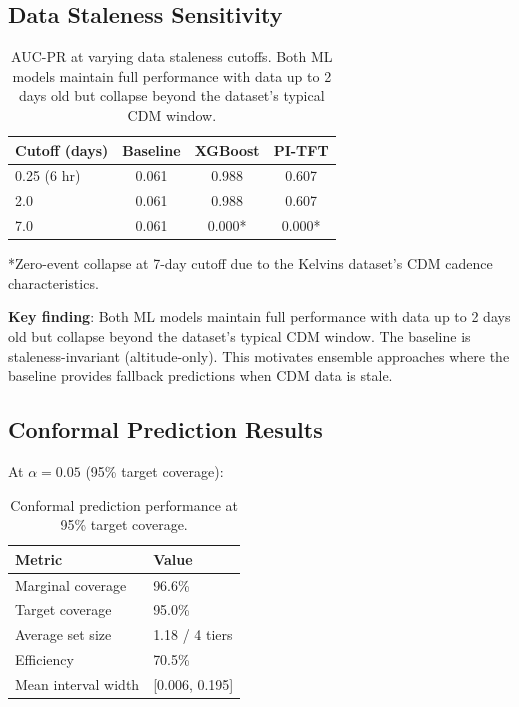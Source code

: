 \documentclass{article}
\begin{document}
\subsection{Data Staleness Sensitivity}
\label{sec:staleness}

\begin{table}[h]
\centering
\caption{AUC-PR at varying data staleness cutoffs. Both ML models maintain full performance with data up to 2 days old but collapse beyond the dataset's typical CDM window.}
\label{tab:staleness}
\begin{tabular}{@{}lccc@{}}
\toprule
Cutoff (days) & Baseline & XGBoost & PI-TFT \\
\midrule
0.25 (6 hr) & 0.061 & 0.988 & 0.607 \\
2.0 & 0.061 & 0.988 & 0.607 \\
7.0 & 0.061 & 0.000* & 0.000* \\
\bottomrule
\end{tabular}

\vspace{2pt}
\footnotesize{*Zero-event collapse at 7-day cutoff due to the Kelvins dataset's CDM cadence characteristics.}
\end{table}

\textbf{Key finding}: Both ML models maintain full performance with data up to 2 days old but collapse beyond the dataset's typical CDM window. The baseline is staleness-invariant (altitude-only). This motivates ensemble approaches where the baseline provides fallback predictions when CDM data is stale.

\subsection{Conformal Prediction Results}
\label{sec:conformal-results}

At $\alpha = 0.05$ (95\% target coverage):

\begin{table}[h]
\centering
\caption{Conformal prediction performance at 95\% target coverage.}
\label{tab:conformal}
\begin{tabular}{@{}ll@{}}
\toprule
Metric & Value \\
\midrule
Marginal coverage & 96.6\% \\
Target coverage & 95.0\% \\
Average set size & 1.18 / 4 tiers \\
Efficiency & 70.5\% \\
Mean interval width & [0.006, 0.195] \\
\bottomrule
\end{tabular}
\end{table}
\end{document}
